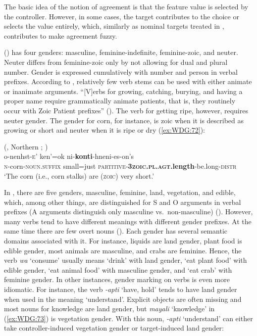 \documentclass[output=collectionpaper]{langsci/langscibook}
\begin{document}
The basic idea of the notion of agreement is that the feature value is selected by the controller. However, in some cases, the target contributes to the choice or selects the value entirely, which, similarly as nominal targets treated in , contributes to make agreement fuzzy.

 () has four genders: masculine, feminine-indefinite, feminine-zoic, and neuter. Neuter differs from feminine-zoic only by not allowing for dual and plural number. Gender is expressed cumulatively with number and person in verbal prefixes. According to \cite[155]{Mithun2014}, relatively few verb stems can be used with either animate or inanimate arguments. ``[V]erbs for growing, catching, burying, and having a proper name require grammatically animate patients, that is, they routinely occur with Zoic Patient prefixes'' (\citealt[155]{Mithun2014}). The verb for getting ripe, however, requires neuter gender. The gender for corn, for instance, is zoic when it is described as growing or short and neuter when it is ripe or dry (\ref{ex:WDG:72}):

\ea\label{ex:WDG:72}
 (, Northern ; \citealt[154]{Mithun2014})\\
\gll o-nenhst-\textsc{e}'	ken'=ok 	ni-\textbf{konti}-hneni-es-on's\\
\textsc{n}-corn-\textsc{noun.suffix}	small=just	\textsc{partitive-\textbf{3zoic.pl.agt}}\textbf{.length}-be.long-\textsc{distr}\\
\glt `The corn (i.e., corn stalks) are (\textsc{zoic}) very short.'\\
\z

In , there are five genders, masculine, feminine, land, vegetation, and edible, which, among other things, are distinguished for S and O arguments in verbal prefixes (A arguments distinguish only masculine vs.\ non-masculine) (\citealt[984]{Singer2012}). However, many verbs tend to have different meanings with different gender prefixes. At the same time there are few overt nouns (\citealt[117]{Singer2018}). Each gender has several semantic domains associated with it. For instance, liquids are land gender, plant food is edible gender, most animals are masculine, and crabs are feminine. Hence, the  verb \textit{wa} `consume' usually means `drink' with land gender, `eat plant food' with edible gender, `eat animal food' with masculine gender, and `eat crab' with feminine gender. In other instances, gender marking on verbs is even more idiomatic. For instance, the  verb \textit{-apti} `have, hold' tends to have land gender when used in the meaning `understand'. Explicit objects are often missing and most nouns for knowledge are land gender, but \textit{mayali} `knowledge' in (\ref{ex:WDG:73}) is vegetation gender. With this noun, \textit{-apti} `understand' can either take controller-induced vegetation gender or target-induced land gender:
\end{document}
